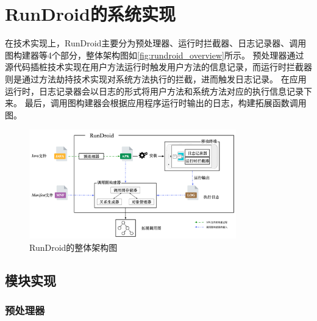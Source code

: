 
\chapter{RunDroid的系统实现 }

\label{chp:implement}




在技术实现上，RunDroid主要分为预处理器、运行时拦截器、日志记录器、调用图构建器等4个部分，整体架构图如\autoref{fig:rundroid_overview}所示。
预处理器通过源代码插桩技术实现在用户方法运行时触发用户方法的信息记录，而运行时拦截器则是通过方法劫持技术实现对系统方法执行的拦截，进而触发日志记录。
在应用运行时，日志记录器会以日志的形式将用户方法和系统方法对应的执行信息记录下来。
最后，调用图构建器会根据应用程序运行时输出的日志，构建拓展函数调用图。

\begin{figure}[!hb]
	\centering
	\includegraphics[width=0.8\textwidth]{./Figures/overview.png}
	\caption{ RunDroid的整体架构图}
	\label{fig:rundroid_overview}
\end{figure}


\section{模块实现}



\subsection{预处理器}

